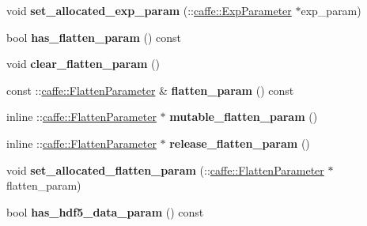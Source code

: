 \begin{DoxyCompactItemize}
\item 
\mbox{\label{classcaffe_1_1_layer_parameter_aa131affe58f3c3f4c7889847909644a4}} 
void {\bfseries set\+\_\+allocated\+\_\+exp\+\_\+param} (\+::\mbox{\hyperlink{classcaffe_1_1_exp_parameter}{caffe\+::\+Exp\+Parameter}} $\ast$exp\+\_\+param)
\item 
\mbox{\label{classcaffe_1_1_layer_parameter_a93753064eb6bf7cd7c2ed4b103b5823d}} 
bool {\bfseries has\+\_\+flatten\+\_\+param} () const
\item 
\mbox{\label{classcaffe_1_1_layer_parameter_a75968191aaa1049b2429463460eddb6b}} 
void {\bfseries clear\+\_\+flatten\+\_\+param} ()
\item 
\mbox{\label{classcaffe_1_1_layer_parameter_aefee432595ab1e861b55d4e2fcb9992a}} 
const \+::\mbox{\hyperlink{classcaffe_1_1_flatten_parameter}{caffe\+::\+Flatten\+Parameter}} \& {\bfseries flatten\+\_\+param} () const
\item 
\mbox{\label{classcaffe_1_1_layer_parameter_aaacd848c0e63669f97b7310288f29f04}} 
inline \+::\mbox{\hyperlink{classcaffe_1_1_flatten_parameter}{caffe\+::\+Flatten\+Parameter}} $\ast$ {\bfseries mutable\+\_\+flatten\+\_\+param} ()
\item 
\mbox{\label{classcaffe_1_1_layer_parameter_a9030375cc93aefcbbc7cd9f7bf22647e}} 
inline \+::\mbox{\hyperlink{classcaffe_1_1_flatten_parameter}{caffe\+::\+Flatten\+Parameter}} $\ast$ {\bfseries release\+\_\+flatten\+\_\+param} ()
\item 
\mbox{\label{classcaffe_1_1_layer_parameter_a52bf0f18889032e918d0a2a8eff71a2e}} 
void {\bfseries set\+\_\+allocated\+\_\+flatten\+\_\+param} (\+::\mbox{\hyperlink{classcaffe_1_1_flatten_parameter}{caffe\+::\+Flatten\+Parameter}} $\ast$flatten\+\_\+param)
\item 
\mbox{\label{classcaffe_1_1_layer_parameter_aea8826b1a38c01804f1d4bd3f5eb0080}} 
bool {\bfseries has\+\_\+hdf5\+\_\+data\+\_\+param} () const
\item 

\end{DoxyCompactItemize}
